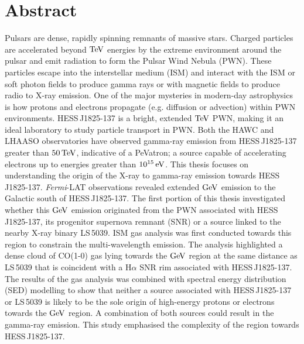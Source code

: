 \chapter{Abstract}
Pulsars are dense, rapidly spinning remnants of massive stars. Charged particles are accelerated beyond $\TeV$ energies by the extreme environment around the pulsar and emit radiation to form the Pulsar Wind Nebula (PWN). These particles escape into the interstellar medium (ISM) and interact with the ISM or soft photon fields to produce gamma rays or with magnetic fields to produce radio to X-ray emission. One of the major mysteries in modern-day astrophysics is how protons and electrons propagate (e.g. diffusion or advection) within PWN environments.
\newpar
\mbox{HESS\,J1825-137} is a bright, extended $\TeV$ PWN, making it an ideal laboratory to study particle transport in PWN. Both the HAWC and LHAASO observatories have observed gamma-ray emission from \mbox{HESS\,J1825-137} greater than $50\,\TeV$, indicative of a PeVatron; a source capable of accelerating electrons up to energies greater than $10^{15}\,\si{\electronvolt}$. This thesis focuses on understanding the origin of the X-ray to gamma-ray emission towards \mbox{HESS\,J1825-137}.
\newpar
\textit{Fermi}-LAT observations revealed extended $\si{\giga\electronvolt}$ emission to the Galactic south of \mbox{HESS\,J1825-137}. The first portion of this thesis investigated whether this $\si{\giga\electronvolt}$ emission originated from the PWN associated with \mbox{HESS\,J1825-137}, its progenitor supernova remnant (SNR) or a source linked to the nearby X-ray binary \mbox{LS\,5039}. ISM gas analysis was first conducted towards this region to constrain the multi-wavelength emission. The analysis highlighted a dense cloud of CO(1-0) gas lying towards the $\si{\giga\electronvolt}$ region at the same distance as \mbox{LS\,5039} that is coincident with a H$\alpha$ SNR rim associated with \mbox{HESS\,J1825-137}. The results of the gas analysis was combined with spectral energy distribution (SED) modelling to show that neither a source associated with \mbox{HESS\,J1825-137} or \mbox{LS\,5039} is likely to be the sole origin of high-energy protons or electrons towards the $\si{\giga\electronvolt}$ region. A combination of both sources could result in the gamma-ray emission. This study emphasised the complexity of the region towards \mbox{HESS\,J1825-137}.
\newpar

